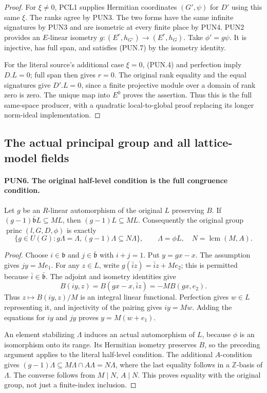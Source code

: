 \documentclass[11pt,a4paper]{article}
\numberwithin{equation}{section}
\theoremstyle{remark}\newtheorem{remark}[theorem]{Remark}
\begin{document}
\begin{proof}
For \(\xi\ne0\), PCL1 supplies Hermitian coordinates
\((G',\psi)\) for \(D'\) using this same \(\xi\).  The ranks
agree by PUN3.  The two forms have the same infinite signatures
by PUN3 and are isometric at every finite place by PUN4.  PUN2
provides an \(E\)-linear isometry
\(g:(E^r,h_{G'})\longrightarrow(E^r,h_G)\).
Take \(\phi'=g\psi\).  It is injective, has full span, and
satisfies (PUN.7) by the isometry identity.

For the literal source's additional case \(\xi=0\), (PUN.4)
and perfection imply \(D.L=0\); full span then gives \(r=0\).
The original rank equality and the equal signatures give
\(D'.L=0\), since a finite projective module over a domain of
rank zero is zero.  The unique map into \(E^0\) proves the
assertion.  Thus this is the full same-space producer, with a
quadratic local-to-global proof replacing its longer norm-ideal
implementation.
\end{proof}

\subsection{The actual principal group and all lattice-model fields}

\paragraph{PUN6. The original half-level condition is the full congruence condition.}
\label{claim:PUN6}
Let \(g\) be an \(R\)-linear automorphism of the original \(L\)
preserving \(B\).  If
\((g-1)\bar{\mathfrak b}L\subseteq ML\), then
\((g-1)L\subseteq ML\).  Consequently the original group
\(\operatorname{princ}(l,G,D,\phi)\) is exactly
\[
 \{g\in U(G):g\Lambda=\Lambda,
                        (g-1)\Lambda\subseteq N\Lambda\},
 \qquad \Lambda=\phi L,\quad N=\operatorname{lcm}(M,A).
 \tag{PUN.8}
\]

\begin{proof}
Choose \(i\in\mathfrak b\) and \(j\in\bar{\mathfrak b}\)
with \(i+j=1\).  Put \(y=gx-x\).  The assumption gives
\(jy=Me_1\).  For any \(z\in L\), write
\(g(\bar i z)=\bar i z+Me_2\); this is permitted because
\(\bar i\in\bar{\mathfrak b}\).  The adjoint and isometry
identities give
\[
 B(iy,z)=B(gx-x,\bar i z)=-M B(gx,e_2).
 \tag{PUN.9}
\]
Thus \(z\mapsto B(iy,z)/M\) is an integral linear functional.
Perfection gives \(w\in L\) representing it, and injectivity of
the pairing gives \(iy=Mw\).  Adding the equations for \(iy\)
and \(jy\) proves \(y=M(w+e_1)\).

An element stabilizing \(\Lambda\) induces an actual automorphism
of \(L\), because \(\phi\) is an isomorphism onto its range.
Its Hermitian isometry preserves \(B\), so the preceding argument
applies to the literal half-level condition.  The additional
\(A\)-condition gives
\((g-1)\Lambda\subseteq M\Lambda\cap A\Lambda=N\Lambda\),
where the last equality follows in a \(\mathbb Z\)-basis of
\(\Lambda\).  The converse follows from \(M\mid N\),
\(A\mid N\).  This proves equality with the original group,
not just a finite-index inclusion.
\end{proof}
\end{document}
